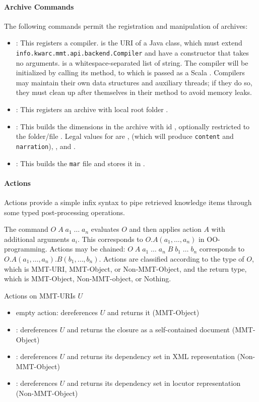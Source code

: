 \paragraph{Archive Commands}
The following commands permit the registration and manipulation of archives:

\begin{itemize}
\item {}: This registers a compiler.  is the URI of a Java class, which must extend \texttt{info.kwarc.mmt.api.backend.Compiler} and have a constructor that takes no arguments.  is a whitespace-separated list of string. The compiler will be initialized by calling its  method, to which  is passed as a Scala . Compilers may maintain their own data structures and auxiliary threads; if they do so, they must clean up after themselves in their  method to avoid memory leaks.
\item {}: This registers an archive with local root folder .
\item {}: This builds the dimensions  in the archive with id , optionally restricted to the folder/file . Legal values for  are ,  (which will produce \texttt{content} and \texttt{narration}), , and .
\item {}: This builds the \texttt{mar} file and stores it in .
\end{itemize}

\paragraph{Actions}
Actions provide a simple infix syntax to pipe retrieved knowledge items through some typed post-processing operations.

The command $O\;A\;a_1\;\ldots\;a_n$ evaluates $O$ and then applies action $A$ with additional arguments $a_i$. This corresponds to $O.A(a_1,\ldots,a_n)$ in OO-programming. Actions may be chained: $O\;A\;a_1\;\ldots\;a_n \;B\;b_1\;\ldots\;b_n$ corresponds to $O.A(a_1,\ldots,a_n).B(b_1,\ldots,b_n)$. Actions are classified according to the type of $O$, which is MMT-URI, MMT-Object, or Non-MMT-Object, and the return type, which is MMT-Object, Non-MMT-object, or Nothing.
\smallskip

\noindent
Actions on MMT-URIs $U$
\begin{itemize}
\item empty action: dereferences $U$ and returns it (MMT-Object)
\item {}: dereferences $U$ and returns the closure as a self-contained document (MMT-Object)
\item {}: dereferences $U$ and returns its dependency set in XML representation (Non-MMT-Object)
\item {}: dereferences $U$ and returns its dependency set in locutor representation (Non-MMT-Object)
\end{itemize}


